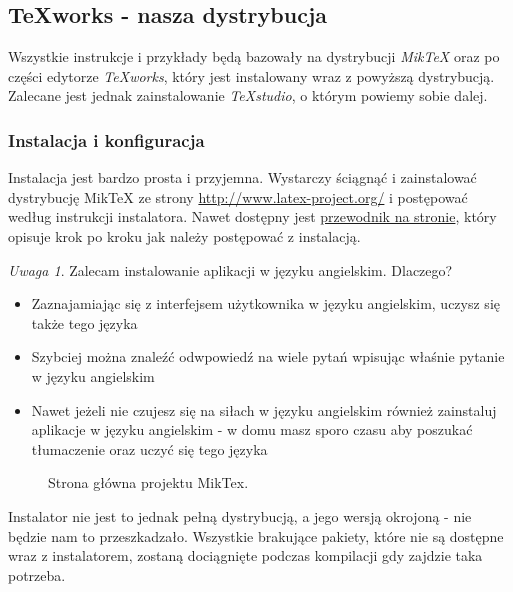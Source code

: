 \documentclass[11pt]{article} %
\theoremstyle{definition}
\theoremstyle{remark}
\newtheorem{remark}{Uwaga}
\begin{document}
\subsection{TeXworks - nasza dystrybucja}
Wszystkie instrukcje i przykłady będą bazowały na dystrybucji \textit{MikTeX} oraz po części edytorze \textit{TeXworks}, który jest instalowany wraz z powyższą dystrybucją. Zalecane jest jednak zainstalowanie \textit{TeXstudio}, o którym powiemy sobie dalej.

\subsubsection{Instalacja i konfiguracja}
Instalacja jest bardzo prosta i przyjemna. Wystarczy ściągnąć i zainstalować dystrybucję MikTeX ze strony \url{http://www.latex-project.org/} i postępować według instrukcji instalatora. Nawet dostępny jest \href{http://miktex.org/howto/install-miktex}{przewodnik na stronie}, który opisuje krok po kroku jak należy postępować z instalacją.
\begin{remark}
	Zalecam instalowanie aplikacji w języku angielskim. Dlaczego?
	\begin{itemize}
		\item Zaznajamiając się z interfejsem użytkownika w języku angielskim, uczysz się także tego języka
		\item Szybciej można znaleźć odwpowiedź na wiele pytań wpisując właśnie pytanie w języku angielskim
		\item Nawet jeżeli nie czujesz się na siłach w języku angielskim również zainstaluj aplikacje w języku angielskim - w domu masz sporo czasu aby poszukać tłumaczenie oraz uczyć się tego języka
	\end{itemize}
\end{remark}
\begin{figure}[!ht]
	\centering
	\caption{Strona główna projektu MikTex.}
\end{figure}
Instalator nie jest to jednak pełną dystrybucją, a jego wersją okrojoną - nie będzie nam to przeszkadzało. Wszystkie brakujące pakiety, które nie są dostępne wraz z instalatorem, zostaną dociągnięte podczas kompilacji gdy zajdzie taka potrzeba.
\end{document}
